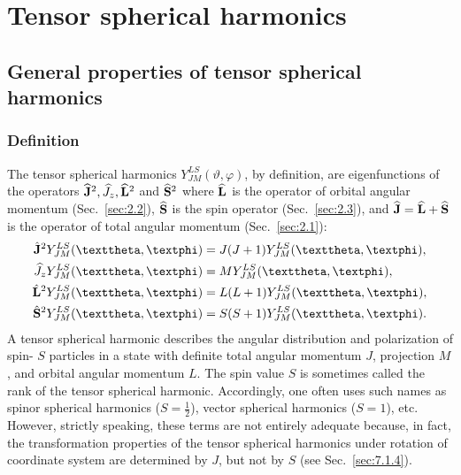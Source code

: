 \chapter{Tensor spherical harmonics}\label{chap:7}
\section{General properties of tensor spherical harmonics}\label{sec:7.1}
\subsection{Definition}\label{sec:7.1.1}
The tensor spherical harmonics $Y_{J M}^{L S}(\vartheta, \varphi)$, by definition, are eigenfunctions of the operators $\widehat{\mathbf{J}}^{2}, \widehat{J}_{z}, \widehat{\mathbf{L}}^{2}$ and $\widehat{\mathbf{S}}^{2}$ where $\widehat{\mathbf{L}}$ is the operator of orbital angular momentum (Sec.~\ref{sec:2.2}), $\widehat{\mathbf{S}}$ is the spin operator (Sec.~\ref{sec:2.3}), and $\widehat{\mathbf{J}}=\widehat{\mathbf{L}}+\widehat{\mathbf{S}}$ is the operator of total angular momentum (Sec.~\ref{sec:2.1}):
\begin{align}
\hat{\vect{J}}^{2} Y_{J M}^{L S}(\vartheta, \varphi) & =J(J+1) Y_{J M}^{L S}(\vartheta, \varphi), \notag\\
\widehat{J}_{z} Y_{J M}^{L S}(\vartheta, \varphi) & =M Y_{J M}^{L S}(\vartheta, \varphi), \notag\\
\hat{\vect{L}}^{2} Y_{J M}^{L S}(\vartheta, \varphi) & =L(L+1) Y_{J M}^{L S}(\vartheta, \varphi), \label{eq:7:1:1}\\
\hat{\vect{S}}^{2} Y_{J M}^{L S}(\vartheta, \varphi) & =S(S+1) Y_{J M}^{L S}(\vartheta, \varphi). \notag
\end{align}
A tensor spherical harmonic describes the angular distribution and polarization of spin- $S$ particles in a state with definite total angular momentum $J$, projection $M$, and orbital angular momentum $L$. The spin value $S$ is sometimes called the rank of the tensor spherical harmonic. Accordingly, one often uses such names as spinor spherical harmonics ($S=\frac{1}{2}$), vector spherical harmonics ($S=1$), etc. However, strictly speaking, these terms are not entirely adequate because, in fact, the transformation properties of the tensor spherical harmonics under rotation of coordinate system are determined by $J$, but not by $S$ (see Sec.~\ref{sec:7.1.4}).

